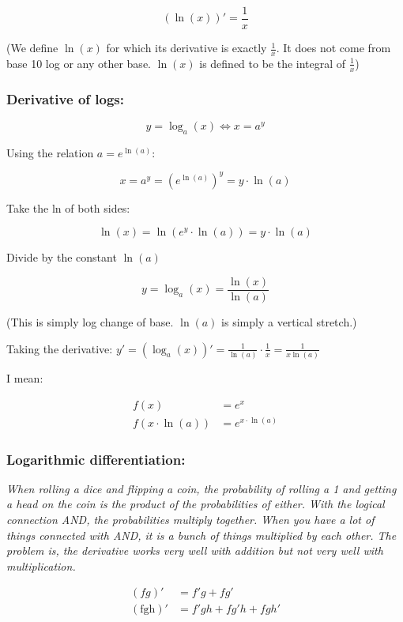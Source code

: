 \documentclass[
]{article}
\begin{document}
$$\left( \ln(x) \right)' = \frac{1}{x}$$

(We define $\ln(x)$ for which its derivative is exactly
$\frac{1}{x}$. It does not come from base 10 log or any other base.
$\ln(x)$ is defined to be the integral of $\frac{1}{x}$)


\subsubsection{Derivative of logs:}

$$y = \log_{a}{(x) \Leftrightarrow x = a^{y}}$$

Using the relation $a = e^{\ln(a)}$:

$$x = a^{y} = \left( e^{\ln(a)} \right)^{y} = y \cdot \ln(a)$$

Take the ln of both sides:

$$\ln(x) = \ln\left( e^{y} \cdot \ln(a) \right) = y \cdot \ln(a)$$

Divide by the constant $\ln(a)$

$$y = \log_{a}(x) = \frac{\ln(x)}{\ln(a)}$$

(This is simply log change of base. $\ln(a)$ is simply a vertical
stretch.)

Taking the derivative:
$y' = \left( \log_{a}(x) \right)' = \frac{1}{\ln(a)} \cdot \frac{1}{x} = \frac{1}{x\ln(a)}$

I mean:

\begin{align*}
f(x) &= e^{x}
 \\
f\left( x \cdot \ln(a) \right) &= e^{x \cdot \ln(a)}
\end{align*}



\subsubsection{Logarithmic
differentiation:}

\emph{When rolling a dice and flipping a coin, the probability of
rolling a 1 and getting a head on the coin is the product of the
probabilities of either. With the logical connection AND, the
probabilities multiply together. When you have a lot of things connected
with AND, it is a bunch of things multiplied by each other. The problem
is, the derivative works very well with addition but not very well with
multiplication.}

\begin{align*}
\left( fg \right)' &= f'g + fg'
 \\
\left( \text{fgh} \right)' &= f'gh + fg'h + fgh'
\end{align*}
\end{document}
